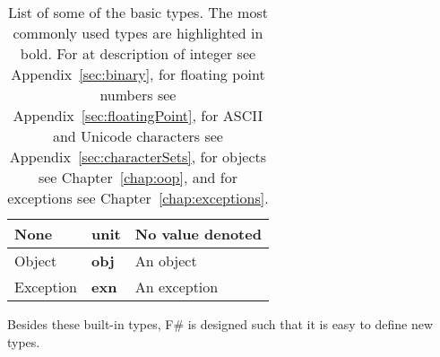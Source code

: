\begin{table}
\begin{tabularx}{\textwidth}{|l|l|>{\raggedright\arraybackslash}X|}
    \hline
    None &\textbf{unit} & No value denoted\\
    \hline
    Object &\textbf{obj} & An object\\
    \hline
    Exception &\textbf{exn} & An exception\\
    \hline
  \end{tabularx}
  \caption{List of some of the basic types. The most commonly used types are highlighted in bold. For at description of integer see Appendix~\ref{sec:binary}, for floating point numbers see Appendix~\ref{sec:floatingPoint}, for ASCII and Unicode characters see Appendix~\ref{sec:characterSets}, for objects see Chapter~\ref{chap:oop}, and for exceptions see Chapter~\ref{chap:exceptions}.}
  \label{tab:primitiveTypes}
\end{table}
Besides these built-in types, F\# is designed such that it is easy to define new types. 

